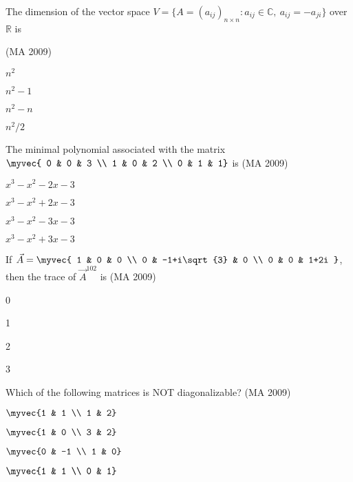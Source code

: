 \item The dimension of the vector space $V = \{ A = (a_{ij})_{n\times n} : a_{ij} \in \mathbb{C},\ a_{ij} = - a_{ji} \}$ over $\mathbb{R}$ is

\hfill (MA 2009)
\begin{enumerate}
\begin{multicols}{4}
    \item $n^2$
    \item $n^2-1$
    \item $n^2-n$
    \item $n^2/2$
\end{multicols}
\end{enumerate}

\item The minimal polynomial associated with the matrix
$\myvec{
0 & 0 & 3 \\
1 & 0 & 2 \\
0 & 1 & 1}$
is
\hfill (MA 2009)
\begin{enumerate}
\begin{multicols}{2}
    \item $x^3-x^2-2x-3$
    \item $x^3-x^2+2x-3$
    \item $x^3-x^2-3x-3$
    \item $x^3-x^2+3x-3$
\end{multicols}
\end{enumerate}
\item If $\vec{A}=
\myvec{
1 & 0 & 0 \\
0 & -1+i\sqrt{3} & 0 \\
0 & 0 & 1+2i
}$, then the trace of $\vec{A}^{102}$ is
\hfill (MA 2009)
\begin{enumerate}
\begin{multicols}{4}
    \item 0
    \item 1
    \item 2
    \item 3
\end{multicols}
\end{enumerate}

\item Which of the following matrices is NOT diagonalizable?
\hfill (MA 2009)
\begin{enumerate}
\begin{multicols}{4}
    \item $\myvec{1 & 1 \\ 1 & 2}$
    \item $\myvec{1 & 0 \\ 3 & 2}$
    \item $\myvec{0 & -1 \\ 1 & 0}$
    \item $\myvec{1 & 1 \\ 0 & 1}$
\end{multicols}
\end{enumerate}

